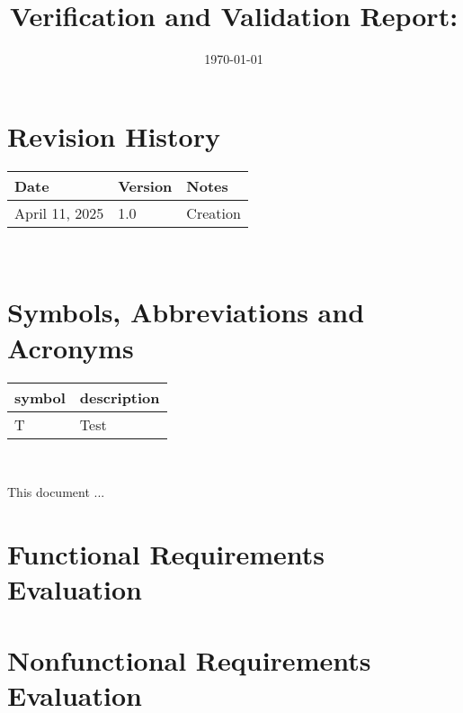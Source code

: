 \documentclass[12pt, titlepage]{article}
\begin{document}
\title{Verification and Validation Report: \progname} 
\author{\authname}
\date{\today}
	
\maketitle


\section{Revision History}

\begin{tabularx}{\textwidth}{p{3cm}p{2cm}X} \toprule {\bf Date} & {\bf Version}
& {\bf Notes}\\
\midrule
April 11, 2025 & 1.0 & Creation\\
\bottomrule
\end{tabularx}

~\newpage

\section{Symbols, Abbreviations and Acronyms}

\renewcommand{\arraystretch}{1.2}
\begin{tabular}{l l} 
  \toprule		
  \textbf{symbol} & \textbf{description}\\
  \midrule 
  T & Test\\
  \bottomrule
\end{tabular}\\

\newpage

\tableofcontents

\listoftables %

\listoffigures %

\newpage


This document ...

\section{Functional Requirements Evaluation}

\section{Nonfunctional Requirements Evaluation}
\end{document}

